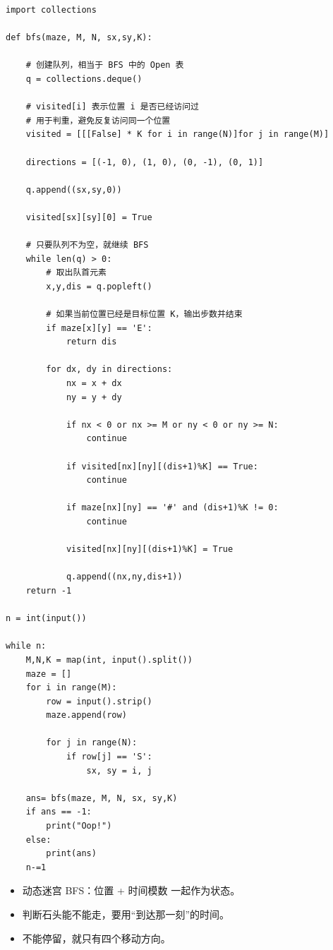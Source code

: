\documentclass[10pt,a4paper,fontset=none]{ctexart}
\begin{document}
\begin{lstlisting}[style=py,caption={最终可用代码（对话来源）}]
import collections

def bfs(maze, M, N, sx,sy,K):

    # 创建队列，相当于 BFS 中的 Open 表
    q = collections.deque()

    # visited[i] 表示位置 i 是否已经访问过
    # 用于判重，避免反复访问同一个位置
    visited = [[[False] * K for i in range(N)]for j in range(M)]

    directions = [(-1, 0), (1, 0), (0, -1), (0, 1)]

    q.append((sx,sy,0))

    visited[sx][sy][0] = True

    # 只要队列不为空，就继续 BFS
    while len(q) > 0:
        # 取出队首元素
        x,y,dis = q.popleft()

        # 如果当前位置已经是目标位置 K，输出步数并结束
        if maze[x][y] == 'E':
            return dis
        
        for dx, dy in directions:
            nx = x + dx
            ny = y + dy

            if nx < 0 or nx >= M or ny < 0 or ny >= N:
                continue

            if visited[nx][ny][(dis+1)%K] == True:
                continue

            if maze[nx][ny] == '#' and (dis+1)%K != 0:
                continue

            visited[nx][ny][(dis+1)%K] = True

            q.append((nx,ny,dis+1))
    return -1

n = int(input())

while n:
    M,N,K = map(int, input().split())
    maze = []
    for i in range(M):
        row = input().strip()
        maze.append(row)

        for j in range(N):
            if row[j] == 'S':
                sx, sy = i, j

    ans= bfs(maze, M, N, sx, sy,K)
    if ans == -1:
        print("Oop!")
    else:
        print(ans)
    n-=1
\end{lstlisting}
\begin{notebox}
\begin{itemize}
  \item 动态迷宫 BFS：位置 + 时间模数 一起作为状态。
  \item 判断石头能不能走，要用“到达那一刻”的时间。
  \item 不能停留，就只有四个移动方向。
\end{itemize}
\end{notebox}
\end{document}
